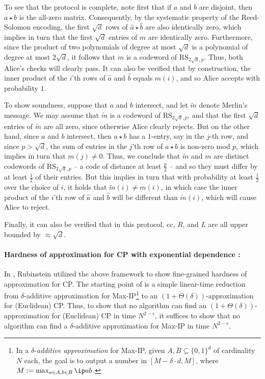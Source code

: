 \documentclass[11pt]{article}
\theoremstyle{plain}
\theoremstyle{remark}
\newcommand{\cc}{\mathrm{cc}}
\begin{document}
 To see that the protocol is complete, note first that if $a$ and $b$ are disjoint, then $a \star b$ is the all-zero matrix. Consequently, by the systematic property of the Reed-Solomon encoding, the first $\sqrt{d}$ rows of $\hat a \star \hat b$ are also identically zero, which implies in turn that the first $\sqrt{d}$ entries of $m$ are identically zero. Furthermore, since the product of
two polynomials of degree at most $\sqrt{d}$ is a polynomial of degree at most $2 \sqrt{d}$, it follows that $m$ is a codeword of $\mathrm{RS}_{2\sqrt{d},p}$. Thus, both Alice's checks will clearly pass. It can also be verified that by construction, the inner product of the $i$'th rows of $\hat a$ and $\hat b$ equals $m(i)$, and so Alice accepts with probability $1$.

To show soundness, suppose that $a$ and $b$ intersect, and let $\tilde m$ denote Merlin's message. We may assume that $\tilde m$ is a codeword of $\mathrm{RS}_{2\sqrt{d},p}$, and that the first $\sqrt{d}$ entries of $\tilde m$ are all zero, since otherwise Alice clearly rejects. But on the other hand, since $a$ and $b$ intersect, then $a \star b$ has a $1$-entry, say in the $j$-th row, and since $p>\sqrt{d}$, the sum of entries in the $j$'th row of $a \star b$ is non-zero mod $p$, which implies in turn that $m(j) \neq 0$. Thus, we conclude that $\tilde m$ and $m$ are distinct codewords of $\mathrm{RS}_{2\sqrt{d},p}$ -- a code of distance at least $\frac p 2$ -- and so they must differ by at least $\frac 1 2$ of their entries. But this implies in turn that with probability at least $\frac 1 2$ over the choice of $i$, it holds that 
$\tilde m(i)\neq m(i)$, in which case the inner product of the $i$'th row of $\hat a$ and $\hat b$ will be different than $\tilde m(i)$, which will cause Alice to reject.

Finally, it can also be verified that in this protocol, $\cc$, $R$, and $L$ are all upper bounded by $\approx \sqrt{d}$. 


\paragraph{Hardness of approximation for CP with exponential dependence \cite{Rub18}:}

In \cite{Rub18}, Rubinstein utilized the above framework to show fine-grained hardness of approximation for CP. 
The starting point of \cite{Rub18}  is a simple linear-time reduction
from $\delta$-additive approximation for Max-IP\footnote{In a $\delta$-\emph{additive approximation} for Max-IP, given $A, B\subseteq\{0,1\}^d$ of cardinality $N$ each, the goal is to output a number in $[M - \delta \cdot d, M]$, where $M:=\max_{a \in A, b \in B} \ip a b$.}  to an $(1+\Theta(\delta))$-approximation for (Euclidean) CP. Thus, to show that no algorithm can find an $(1+\Theta(\delta))$-approximation for (Euclidean) CP in time $N^{2-\epsilon}$, it suffices to show that no algorithm can find a $\delta$-additive approximation for Max-IP in time $N^{2-\epsilon}$. 
\end{document}
